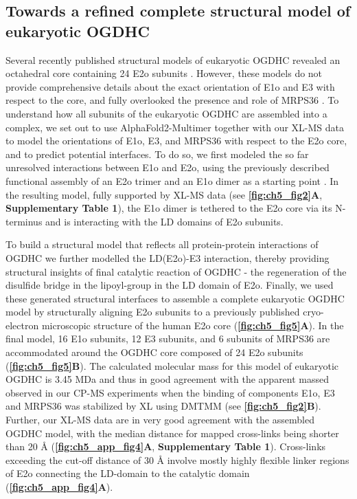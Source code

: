 \subsection*{Towards a refined complete structural model of eukaryotic OGDHC}
Several recently published structural models of eukaryotic OGDHC revealed an octahedral core containing 24 E2o subunits \cite{Lengyel_2008, Liu_2022, Nagy_2021}. However, these models do not provide comprehensive details about the exact orientation of E1o and E3 with respect to the core, and fully overlooked the presence and role of MRPS36 \cite{Lengyel_2008, Liu_2022, Nagy_2021}. To understand how all subunits of the eukaryotic OGDHC are assembled into a complex, we set out to use AlphaFold2-Multimer \cite{Evans_2022} together with our XL-MS data to model the orientations of E1o, E3, and MRPS36 with respect to the E2o core, and to predict potential interfaces. To do so, we first modeled the so far unresolved interactions between E1o and E2o, using the previously described functional assembly of an E2o trimer and an E1o dimer as a starting point \cite{Perham_1991, Perham_2000, Reed_1974}. In the resulting model, fully supported by XL-MS data (see \textbf{\autoref{fig:ch5_fig2}A}, \textbf{Supplementary Table 1}), the E1o dimer is tethered to the E2o core via its N-terminus and is interacting with the LD domains of E2o subunits.

To build a structural model that reflects all protein-protein interactions of OGDHC we further modelled the LD(E2o)-E3 interaction, thereby providing structural insights of final catalytic reaction of OGDHC - the regeneration of the disulfide bridge in the lipoyl-group in the LD domain of E2o. Finally, we used these generated structural interfaces to assemble a complete eukaryotic OGDHC model by structurally aligning E2o subunits to a previously published cryo-electron microscopic structure of the human E2o core \cite{Nagy_2021} (\textbf{\autoref{fig:ch5_fig5}A}). In the final model, 16 E1o subunits, 12 E3 subunits, and 6 subunits of MRPS36 are accommodated around the OGDHC core composed of 24 E2o subunits (\textbf{\autoref{fig:ch5_fig5}B}). The calculated molecular mass for this model of eukaryotic OGDHC is 3.45 MDa and thus in good agreement with the apparent massed observed in our CP-MS experiments when the binding of components E1o, E3 and MRPS36 was stabilized by XL using DMTMM (see \textbf{\autoref{fig:ch5_fig2}B}). Further, our XL-MS data are in very good agreement with the assembled OGDHC model, with the median distance for mapped cross-links being shorter than 20 Å (\textbf{\autoref{fig:ch5_app_fig4}A}, \textbf{Supplementary Table 1}). Cross-links exceeding the cut-off distance of 30 Å involve mostly highly flexible linker regions of E2o connecting the LD-domain to the catalytic domain (\textbf{\autoref{fig:ch5_app_fig4}A}).

